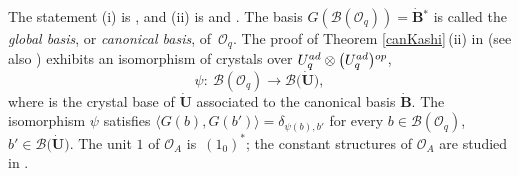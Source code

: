 \documentclass[11pt]{article}
\numberwithin{equation}{section}
\numberwithin{equation}{section}
\theoremstyle{definition}
\newcommand{\Ll}{{\mathcal L}}
\newcommand{\Oo}{{\mathcal O}}
\newcommand{\ra}{\rightarrow}
\begin{document}
The statement (i) is \cite[Theorem~1]{Kashiwara2}, and (ii) is \cite[Theorem 10.1 and Proposition 10.2.2]{Kashiwara3} and \cite[Section~29.5]{Lusztig}. The basis $G(\mathcal{B}(\Oo_q))=\dot{\mathbf{B}} {}^*$ is called the {\it global basis}, or {\it canonical basis}, of~$\Oo_q$. The proof of Theorem \ref{canKashi}\,(ii) in \cite{Kashiwara3} (see also \cite{Kashiwara4}) exhibits an isomorphism of crystals over $U_q^{\rm ad} \otimes \big(U_q^{\rm ad}\big){}^{\rm op}$,
\begin{equation}\label{isocrystal}
\psi\colon\ \mathcal{B}(\Oo_q) \ra \mathcal{B}\bigl(\dot{\mathbf{U}}\bigr),
\end{equation}
where \smash{$\big(\Ll\bigl(\dot{\mathbf{U}}\bigr),\mathcal{B}\bigl(\dot{\mathbf{U}}\bigr)\big)$} is the crystal base of $\dot{\mathbf{U}}$ associated to the canonical basis $\dot{\mathbf{B}}$. The isomorphism $\psi$ satisfies $\langle G(b),G(b')\rangle =\delta_{\psi(b),b'}$ for every $b\in \mathcal{B}(\Oo_q)$, $b'\in \mathcal{B}\bigl(\dot{\mathbf{U}}\bigr)$. The unit $1$ of $\Oo_A$ is~$(1_0)^*$; the constant structures of $\Oo_A$ are studied in \cite{Lusztig,Lusztig3}.
\end{document}
